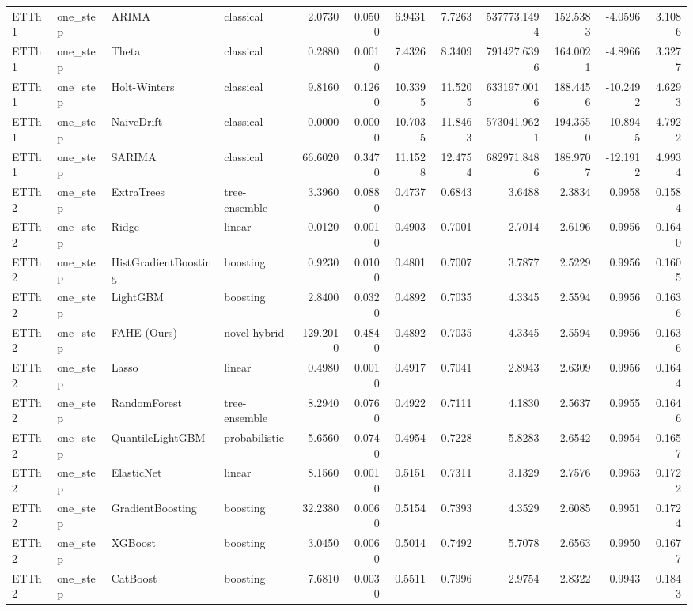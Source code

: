 \begin{tabular}{llllrrrrrrrr}
ETTh1 & one_step & ARIMA & classical & 2.0730 & 0.0500 & 6.9431 & 7.7263 & 537773.1494 & 152.5383 & -4.0596 & 3.1086 \\
ETTh1 & one_step & Theta & classical & 0.2880 & 0.0010 & 7.4326 & 8.3409 & 791427.6396 & 164.0021 & -4.8966 & 3.3277 \\
ETTh1 & one_step & Holt-Winters & classical & 9.8160 & 0.1260 & 10.3395 & 11.5205 & 633197.0016 & 188.4456 & -10.2492 & 4.6293 \\
ETTh1 & one_step & NaiveDrift & classical & 0.0000 & 0.0000 & 10.7035 & 11.8463 & 573041.9621 & 194.3550 & -10.8945 & 4.7922 \\
ETTh1 & one_step & SARIMA & classical & 66.6020 & 0.3470 & 11.1528 & 12.4754 & 682971.8486 & 188.9707 & -12.1912 & 4.9934 \\
ETTh2 & one_step & ExtraTrees & tree-ensemble & 3.3960 & 0.0880 & 0.4737 & 0.6843 & 3.6488 & 2.3834 & 0.9958 & 0.1584 \\
ETTh2 & one_step & Ridge & linear & 0.0120 & 0.0010 & 0.4903 & 0.7001 & 2.7014 & 2.6196 & 0.9956 & 0.1640 \\
ETTh2 & one_step & HistGradientBoosting & boosting & 0.9230 & 0.0100 & 0.4801 & 0.7007 & 3.7877 & 2.5229 & 0.9956 & 0.1605 \\
ETTh2 & one_step & LightGBM & boosting & 2.8400 & 0.0320 & 0.4892 & 0.7035 & 4.3345 & 2.5594 & 0.9956 & 0.1636 \\
ETTh2 & one_step & FAHE (Ours) & novel-hybrid & 129.2010 & 0.4840 & 0.4892 & 0.7035 & 4.3345 & 2.5594 & 0.9956 & 0.1636 \\
ETTh2 & one_step & Lasso & linear & 0.4980 & 0.0010 & 0.4917 & 0.7041 & 2.8943 & 2.6309 & 0.9956 & 0.1644 \\
ETTh2 & one_step & RandomForest & tree-ensemble & 8.2940 & 0.0760 & 0.4922 & 0.7111 & 4.1830 & 2.5637 & 0.9955 & 0.1646 \\
ETTh2 & one_step & QuantileLightGBM & probabilistic & 5.6560 & 0.0740 & 0.4954 & 0.7228 & 5.8283 & 2.6542 & 0.9954 & 0.1657 \\
ETTh2 & one_step & ElasticNet & linear & 8.1560 & 0.0010 & 0.5151 & 0.7311 & 3.1329 & 2.7576 & 0.9953 & 0.1722 \\
ETTh2 & one_step & GradientBoosting & boosting & 32.2380 & 0.0060 & 0.5154 & 0.7393 & 4.3529 & 2.6085 & 0.9951 & 0.1724 \\
ETTh2 & one_step & XGBoost & boosting & 3.0450 & 0.0060 & 0.5014 & 0.7492 & 5.7078 & 2.6563 & 0.9950 & 0.1677 \\
ETTh2 & one_step & CatBoost & boosting & 7.6810 & 0.0030 & 0.5511 & 0.7996 & 2.9754 & 2.8322 & 0.9943 & 0.1843 \\

\end{tabular}

